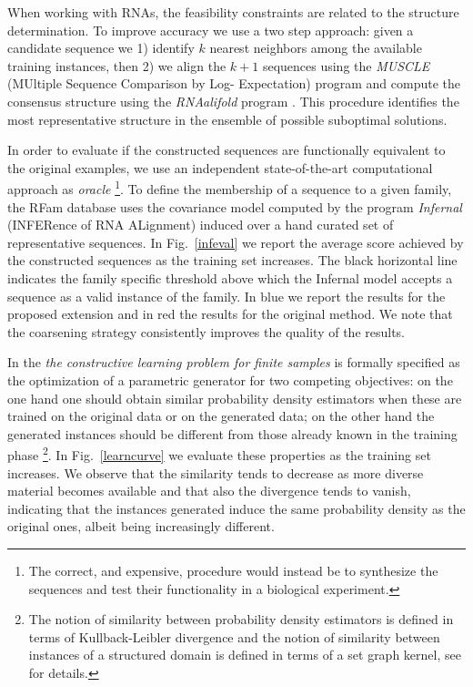 \documentclass{article}
\begin{document}
When working with RNAs, the feasibility constraints are related to the
structure determination. To improve accuracy we use a two step approach:
given a candidate sequence we 1) identify $k$ nearest neighbors among the
available training instances, then 2) we align the $k+1$ sequences using the
\emph{MUSCLE} (MUltiple Sequence Comparison by Log- Expectation) program
\citep{muscle} and compute the consensus structure using the \emph{RNAalifold}
program \citep{rnaalifold}. This procedure identifies
the most representative structure in the ensemble of possible suboptimal
solutions.

In order to evaluate if the constructed sequences are functionally equivalent
to the original examples, we use an independent state-of-the-art computational
approach as {\em oracle} \footnote{The correct, and expensive, procedure would
instead be to synthesize the sequences and test their functionality in a
biological experiment.}. To define the membership of a sequence to a given
family, the RFam database uses the covariance model computed by the program
\emph{Infernal} (INFERence of RNA ALignment) \citep{infernal} induced over a
hand curated set of representative sequences.
In Fig.~\ref{infeval} we report the average score achieved by the constructed
sequences as the training set increases. The black horizontal line indicates
the family specific threshold above which the Infernal model accepts a
sequence as a valid instance of the family. In blue we report the results for
the proposed extension and in red the results for the original method. We note
that the coarsening strategy consistently improves the quality of the results. 

In \cite{costa16} the \emph{the constructive learning problem for finite
samples} is formally specified as the optimization of a parametric generator
for two competing objectives: on the one hand one should obtain similar
probability density estimators when these are trained on the original data or
on the generated data; on the other hand the generated instances should be
different from those already known in the training phase \footnote{The notion
of similarity between probability density estimators is defined in terms of
Kullback-Leibler divergence and the notion of similarity between instances of
a structured domain is defined in terms of a set graph kernel, see
\citep{costa16} for details.}. In Fig.~\ref{learncurve} we evaluate these
properties as the training set increases. We observe that the similarity tends
to decrease as more diverse material becomes available and that also the
divergence tends to vanish, indicating that the instances generated induce the
same probability density as the original ones, albeit being increasingly
different.
\end{document}
